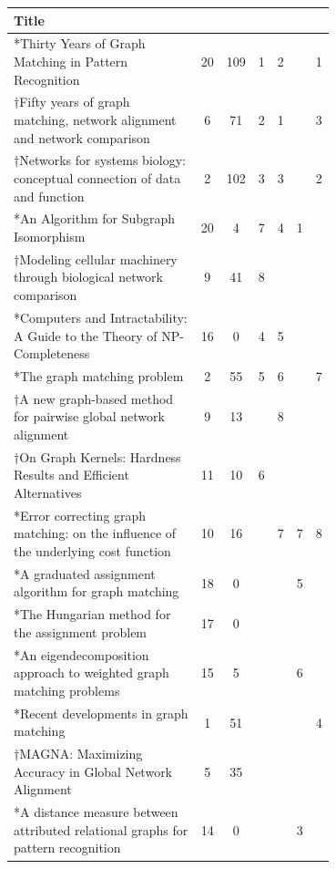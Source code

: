 \documentclass[12pt]{thesis}
\theoremstyle{plain}
\theoremstyle{definition}
\theoremstyle{remark}
\begin{document}
\begin{table}[H]
\centering
\vspace{-.5cm}
{\fontsize{10.5}{13}\selectfont
\begin{tabular}{|L{0.7\linewidth}|c|c|c|c|c|c|}
\hline
Title &  &   &  &   &   &  \\ 
\hline\hline
*Thirty Years of Graph Matching in Pattern Recognition & 20 & 109 & 1 & 2 &  & 1 \\ \hline
$\dagger$Fifty years of graph matching, network alignment and network comparison & 6 & 71 & 2 & 1 &  & 3 \\ \hline
$\dagger$Networks for systems biology: conceptual connection of data and function & 2 & 102 & 3 & 3 &  & 2 \\ \hline
*An Algorithm for Subgraph Isomorphism & 20 & 4 & 7 & 4 & 1 &  \\ \hline
$\dagger$Modeling cellular machinery through biological network comparison & 9 & 41 & 8 &  &  &  \\ \hline
*Computers and Intractability: A Guide to the Theory of NP-Completeness & 16 & 0 & 4 & 5 &  &  \\ \hline
*The graph matching problem & 2 & 55 & 5 & 6 &  & 7 \\ \hline
$\dagger$A new graph-based method for pairwise global network alignment & 9 & 13 &  & 8 &  &  \\ \hline
$\dagger$On Graph Kernels: Hardness Results and Efficient Alternatives & 11 & 10 & 6 &  &  &  \\ \hline
*Error correcting graph matching: on the influence of the underlying cost function & 10 & 16 &  & 7 & 7 & 8 \\ \hline
*A graduated assignment algorithm for graph matching & 18 & 0 &  &  & 5 &  \\ \hline
*The Hungarian method for the assignment problem & 17 & 0 &  &  &  &  \\ \hline
*An eigendecomposition approach to weighted graph matching problems & 15 & 5 &  &  & 6 &  \\ \hline
*Recent developments in graph matching & 1 & 51 &  &  &  & 4 \\ \hline
$\dagger$MAGNA: Maximizing Accuracy in Global Network Alignment & 5 & 35 &  &  &  &  \\ \hline
*A distance measure between attributed relational graphs for pattern recognition & 14 & 0 &  &  & 3 &  \\ \hline

\end{tabular}}
\end{table}
\end{document}
